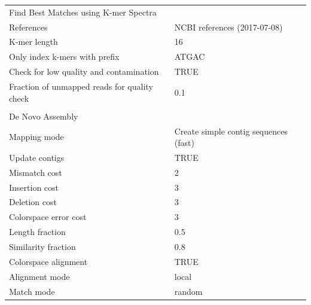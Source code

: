 \begin{longtable}{ll}
\multicolumn{2}{l}{Find Best Matches using K-mer Spectra}                                     \\
References                                   & NCBI references (2017-07-08)                   \\
K-mer length                                 & 16                                             \\
Only index k-mers with prefix                & ATGAC                                          \\
Check for low quality and contamination      & TRUE                                           \\
Fraction of unmapped reads for quality check & 0.1                                            \\
                                             &                                                \\
De Novo Assembly                             &                                                \\
Mapping mode                                 & Create simple contig sequences (fast)          \\
Update contigs                               & TRUE                                           \\
Mismatch cost                                & 2                                              \\
Insertion cost                               & 3                                              \\
Deletion cost                                & 3                                              \\
Colorspace error cost                        & 3                                              \\
Length fraction                              & 0.5                                            \\
Similarity fraction                          & 0.8                                            \\
Colorspace alignment                         & TRUE                                           \\
Alignment mode                               & local                                          \\
Match mode                                   & random                                         \\

\end{longtable}
